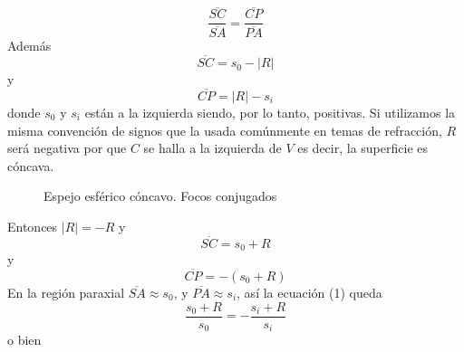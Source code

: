 \documentclass[13,twocolumn,letterpaper]{article}
\begin{document}
{\begin{equation}
\dfrac{\overline{SC}}{\overline{SA}}=\dfrac{\overline{CP}}{\overline{PA}}
\end{equation}
Además
$$\overline{SC}=s_{0}-|R|$$
y
$$\overline{CP}=|R|-s_{i}$$
donde $s_{0}$ y $s_{i}$ están a la izquierda siendo, por lo tanto, positivas. Si utilizamos la misma convención de signos que la usada comúnmente en temas de refracción, $R$ será negativa por que $C$ se halla  a la izquierda de $V$ es decir, la superficie es cóncava. 
\begin{figure}[h!]
	\centering
	\caption{Espejo esférico cóncavo. Focos conjugados }
	\label{fig:fig2}
\end{figure}
Entonces $|R|=-R$ y 
$$\overline{SC}=s_0+R$$
y $$\overline{CP}=-(s_{0}+R)$$
En la región paraxial $\overline{SA}\approx s_{0}$, y $\overline{PA}\approx s_{i}$, así la ecuación (1) queda
$$\dfrac{s_{0}+R}{s_{0}}=-\dfrac{s_{i}+R}{s_{i}}$$
o bien 
\begin{equation}

\end{equation}}
\end{document}
